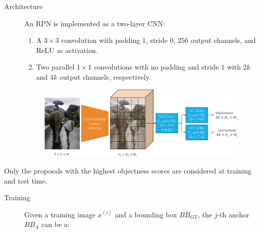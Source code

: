 \begin{description}
\begin{description}
\begin{description}
                \item[Architecture]
                    An RPN is implemented as a two-layer CNN:
                    \begin{enumerate}
                        \item A $3 \times 3$ convolution with padding $1$, stride $0$, $256$ output channels, and ReLU as activation.
                        \item Two parallel $1 \times 1$ convolutions with no padding and stride $1$ with $2k$ and $4k$ output channels, respectively.
                    \end{enumerate}
                    \begin{figure}[H]
                        \raggedleft
                        \includegraphics[width=0.7\linewidth]{./img/_rpn_architecture.pdf}
                    \end{figure}
            \end{description}

            \begin{remark}
                Only the proposals with the highest objectness scores are considered at training and test time.
            \end{remark}

            \begin{description}
                \item[Training]
                    Given a training image $x^{(i)}$ and a bounding box $BB_\text{GT}$, the $j$-th anchor $BB_A$ can be a:


\end{description}
\end{description}
\end{description}
